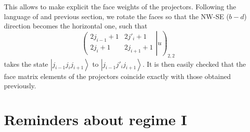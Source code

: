 \documentclass[11pt]{article}
\newcommand{\q}{\mathfrak{q}}
\begin{document}
This allows to make explicit the face weights of the projectors. 
Following the language of \cite{Vincent} and previous section, we rotate the faces so that the NW-SE ($b-d$) direction becomes the horizontal one, such that
$$ \left.\left( \begin{array}{cc} 2 j_{i-1} +1 & 2 j'_i +1 \\ 2 j_i +1 &  2 j_{i+1}+1 \end{array} \right| u  \right)_{2,2}$$
takes the state $\left| j_{i-1} j_i j_{i+1}\right\rangle$ to $\left| j_{i-1} j'_i j_{i+1}\right\rangle$.
It is then easily checked that the face matrix elements of the projectors coincide exactly with those obtained previously. 





% 

\section{Reminders about regime I}
\label{app:B}
\end{document}

